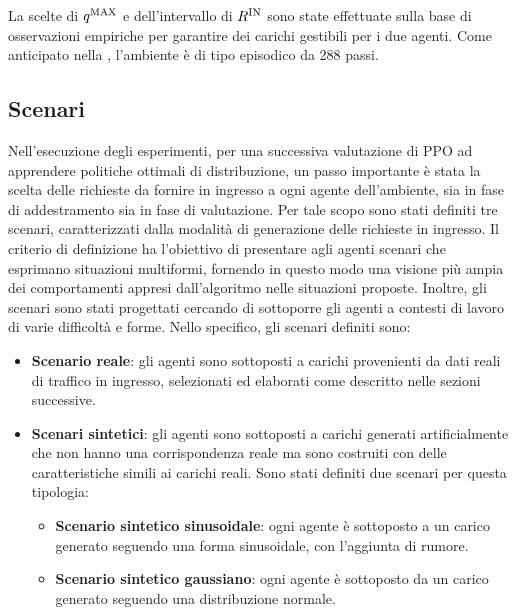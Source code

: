 La scelte di $q^\textnormal{MAX}$ e dell'intervallo di $R^\textnormal{IN}$ sono state effettuate sulla base di osservazioni empiriche per garantire dei carichi gestibili per i due agenti. Come anticipato nella , l'ambiente è di tipo episodico da 288 passi.

\subsection{Scenari}
\label{sec:5_scenari}

Nell'esecuzione degli esperimenti, per una successiva valutazione di PPO ad apprendere politiche ottimali di distribuzione, un passo importante è stata la scelta delle richieste da fornire in ingresso a ogni agente dell'ambiente, sia in fase di addestramento sia in fase di valutazione. Per tale scopo sono stati definiti tre scenari, caratterizzati dalla modalità di generazione delle richieste in ingresso. Il criterio di definizione ha l'obiettivo di presentare agli agenti scenari che esprimano situazioni multiformi, fornendo in questo modo una visione più ampia dei comportamenti appresi dall'algoritmo nelle situazioni proposte. Inoltre, gli scenari sono stati progettati cercando di sottoporre gli agenti a contesti di lavoro di varie difficoltà e forme. Nello specifico, gli scenari definiti sono:

\begin{itemize}
    \item \textbf{Scenario reale}: gli agenti sono sottoposti a carichi provenienti da dati reali di traffico in ingresso, selezionati ed elaborati come descritto nelle sezioni successive.

    \item \textbf{Scenari sintetici}: gli agenti sono sottoposti a carichi generati artificialmente che non hanno una corrispondenza reale ma sono costruiti con delle caratteristiche simili ai carichi reali. Sono stati definiti due scenari per questa tipologia:

        \begin{itemize}
            \item \textbf{Scenario sintetico sinusoidale}: ogni agente è sottoposto a un carico generato seguendo una forma sinusoidale, con l'aggiunta di rumore.

            \item \textbf{Scenario sintetico gaussiano}: ogni agente è sottoposto da un carico generato seguendo una distribuzione normale.
        \end{itemize}
\end{itemize}

